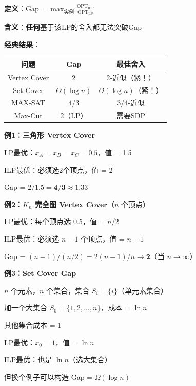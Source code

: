 \documentclass[12pt, a4paper]{ctexart}
\begin{document}
\begin{blackboard}

\textbf{定义}：$\text{Gap} = \max_{\text{实例}} \frac{\text{OPT}_{\text{ILP}}}{\text{OPT}_{\text{LP}}}$

\textbf{含义}：\textbf{任何}基于该LP的舍入都无法突破Gap

\textbf{经典结果}：
\begin{center}
\begin{tabular}{c|c|c}
问题 & Gap & 最佳舍入 \\
\hline
Vertex Cover & 2 & 2-近似（紧！） \\
Set Cover & $\Theta(\log n)$ & $O(\log n)$（紧！） \\
MAX-SAT & 4/3 & 3/4-近似 \\
Max-Cut & 2（LP） & 需要SDP
\end{tabular}
\end{center}

\end{blackboard}

\begin{blackboard}

\textbf{例1：三角形 Vertex Cover}

LP最优：$x_A = x_B = x_C = 0.5$，值 = 1.5

ILP最优：必须选2个顶点，值 = 2

Gap = $2 / 1.5 = \mathbf{4/3} \approx 1.33$

\textbf{例2：$K_n$ 完全图 Vertex Cover}（$n$ 个顶点）

LP最优：每个顶点选 0.5，值 = $n/2$

ILP最优：必须选 $n-1$ 个顶点，值 = $n-1$

Gap = $(n-1) / (n/2) = 2(n-1)/n \to \mathbf{2}$（当 $n \to \infty$）

\textbf{例3：Set Cover Gap}

$n$ 个元素，$n$ 个集合，集合 $S_i = \{i\}$（单元素集合）

加一个大集合 $S_0 = \{1, 2, \ldots, n\}$，成本 = $\ln n$

其他集合成本 = 1

LP最优：$x_0 = 1$，值 = $\ln n$

ILP最优：也是 $\ln n$（选大集合）

但换个例子可以构造 Gap = $\Omega(\log n)$

\end{blackboard}
\end{document}
